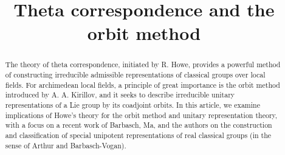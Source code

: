 \documentclass[lang = american]{ems-icm} %
\numberwithin{equation}{section}
\theoremstyle{remark}
\begin{document}

\title{Theta correspondence and the orbit method}














\begin{abstract}
The theory of theta correspondence, initiated by R. Howe, provides a powerful method of constructing irreducible admissible representations of classical groups over local fields. For archimedean local fields, a principle of great importance is the orbit method introduced by A. A. Kirillov, and it seeks to describe irreducible unitary representations of a Lie group by its coadjoint orbits. In this article, we examine implications of Howe's theory for the orbit method and unitary representation theory, with a focus on a recent work of Barbasch, Ma, and the authors on the construction and classification of special unipotent representations of real classical groups (in the sense of Arthur and Barbasch-Vogan).
\end{abstract}

\maketitle
\end{document}
